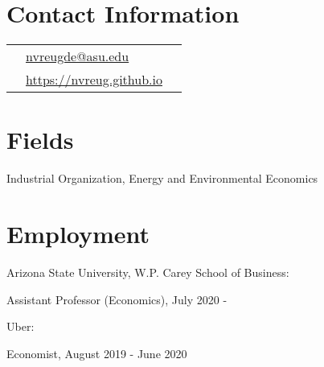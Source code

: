 \documentclass[margin,line]{res}
\newenvironment{list1}{
  \begin{list}{\ding{113}}{%
      \setlength{\itemsep}{.025in}
      \setlength{\parsep}{0in} \setlength{\parskip}{0in}
      \setlength{\topsep}{0in} \setlength{\partopsep}{0in}
      \setlength{\leftmargin}{0.17in}}}{\end{list}}
\begin{document}


\begin{resume}
\thispagestyle{plain} %

\section{ Contact Information}
\vspace{.05in}
\begin{tabular}{@{}p{0.20in}p{2.75in}p{2.75in}}
 &  \href{mailto: nvreugde@asu.edu}{nvreugde@asu.edu}   & \\
 &\href{https://nvreug.github.io}{https://nvreug.github.io} & \\ 
\end{tabular}

\section{ Fields}
\begin{list1}
\item[] Industrial Organization, Energy and Environmental Economics
\vspace*{.05in}
\end{list1}

\section{ Employment}
\begin{list1}
	\item[] Arizona State University, W.P. Carey School of Business: 
	\item[] \hspace{11pt} Assistant Professor (Economics), July 2020 -
	\item[] Uber: 
	\item[] \hspace{11pt} Economist, August 2019 - June 2020
	\vspace*{.05in}
\end{list1}


\end{resume}
\end{document}
